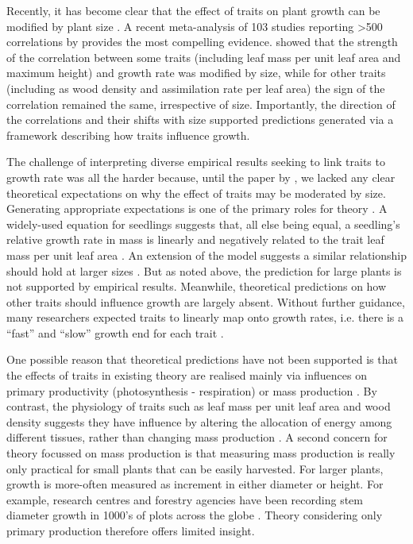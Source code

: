 \documentclass[a4paper,11pt]{article}
\begin{document}
Recently, it has become clear that the effect of traits on plant growth can be modified by plant size \citep{Falster-2011, Ruger-2012, Iida-2014, Visser-2016, Gibert-2016}. A recent meta-analysis of 103 studies reporting \textgreater 500 correlations by \citet{Gibert-2016} provides the most compelling evidence. \citet{Gibert-2016} showed that the strength of the correlation between some traits (including leaf mass per unit leaf area and maximum height) and growth rate was modified by size, while for other traits (including as wood density and assimilation rate per leaf area) the sign of the correlation remained the same, irrespective of size. Importantly, the direction of the correlations and their shifts with size supported predictions generated via a framework describing how traits influence growth.

The challenge of interpreting diverse empirical results seeking to link traits to growth rate was all the harder because, until the paper by \citet{Gibert-2016}, we lacked any clear theoretical expectations on why the effect of traits may be moderated by size. Generating appropriate expectations is one of the primary roles for theory \citep{Kokko-2007}. A widely-used equation for seedlings suggests that, all else being equal, a seedling's relative growth rate in mass is linearly and negatively related to the trait leaf mass per unit leaf area \citep{Lambers-1992, Cornelissen-1996, Wright-2000}. An extension of the model suggests a similar relationship should hold at larger sizes \citep{Enquist-2007}. But as noted above, the prediction for large plants is not supported by empirical results. Meanwhile, theoretical predictions on how other traits should influence growth are largely absent. Without further guidance, many researchers expected traits to linearly map onto growth rates, i.e. there is a ``fast'' and ``slow'' growth end for each trait \citep[e.g.][]{Grime-1977, Poorter-2008, Chave-2009, Paine-2015}.

One possible reason that theoretical predictions have not been supported is that the effects of traits in existing theory are realised mainly via influences on primary productivity (photosynthesis - respiration) or mass production \citep{Wright-2000,Enquist-2007}. By contrast, the physiology of traits such as leaf mass per unit leaf area and wood density suggests they have influence by altering the allocation of energy among different tissues, rather than changing mass production \citep{Falster-2011, Duursma-2016, Gibert-2016}. A second concern for theory focussed on mass production is that measuring mass production is really only practical for small plants that can be easily harvested. For larger plants, growth is more-often measured as increment in either diameter or height. For example, research centres and forestry agencies have been recording stem diameter growth in 1000's of plots across the globe \citep{Purves-2008, Anderson-2015, Kunstler-2016}. Theory considering only primary production therefore offers limited insight.
\end{document}
